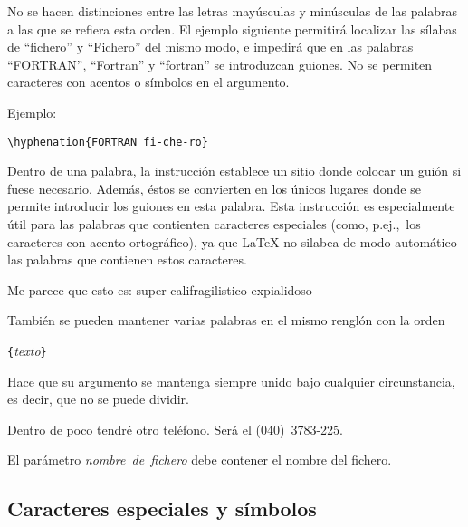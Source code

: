 
No se hacen  distinciones entre las letras mayúsculas  y minúsculas de
las palabras  a las que  se refiera  esta orden. El  ejemplo siguiente
permitirá localizar las sílabas de ``fichero'' y ``Fichero'' del mismo
modo,  e  impedirá que  en  las  palabras ``FORTRAN'',  ``Fortran''  y
``fortran''  se introduzcan  guiones.  No se  permiten caracteres  con
acentos o símbolos en el argumento.


Ejemplo:
\begin{code}
\verb|\hyphenation{FORTRAN fi-che-ro}|
\end{code}

Dentro de una palabra, la  instrucción \ci{-} establece un sitio donde
colocar un  guión si fuese  necesario. Además, éstos se  convierten en
los únicos  lugares donde  se permite introducir  los guiones  en esta
palabra. Esta instrucción es especialmente  útil para las palabras que
contienten  caracteres especiales  (como, p.ej.,\  los caracteres  con
acento ortográfico), ya que \LaTeX{} no silabea de modo automático las
palabras que contienen estos caracteres.


\begin{example}
Me parece que esto es: su\-per\-%
ca\-li\-fra\-gi\-lis\-ti\-co\-%
ex\-pia\-li\-do\-so
\end{example}

También se pueden mantener varias palabras  en el mismo renglón con la
orden

\begin{command}
\verb|{|\emph{texto}\verb|}|
\end{command}

\noindent  Hace  que  su  argumento se  mantenga  siempre  unido  bajo
cualquier circunstancia, es decir, que no se puede dividir.

\begin{example}
Dentro de poco tendré otro teléfono.
Será el \mbox{(040) 3783-225}.

El parámetro \mbox{\emph{nombre
de fichero}} debe contener el nombre
del fichero.
\end{example}

\subsection{Caracteres especiales y símbolos}
 
